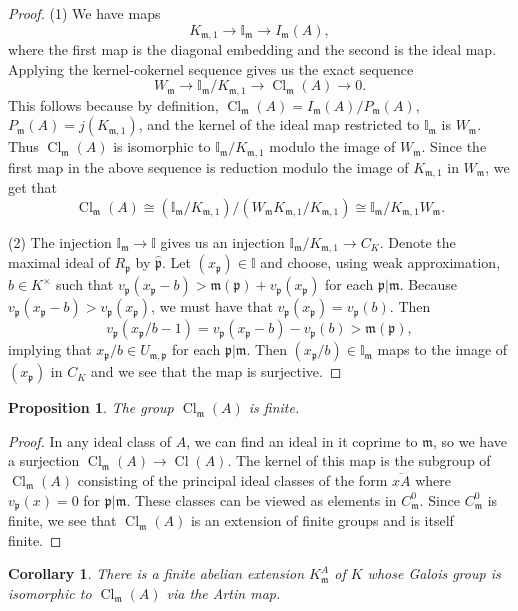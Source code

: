 \documentclass[12pt,reqno]{amsart}
\newcommand{\mm}{\mathfrak{m}}
\newcommand{\pp}{\mathfrak{p}}
\newcommand{\II}{\mathbb{I}}
\DeclareMathOperator{\Cl}{Cl}
\newtheorem{prop}[thm]{Proposition}
\newtheorem{cor}[thm]{Corollary}
\theoremstyle{definition}
\begin{document}
\begin{proof}
(1) We have maps
\[
K_{\mm,1}\to \II_{\mm}\to I_{\mm}(A),
\]
where the first map is the diagonal embedding and the second is the ideal map. Applying the kernel-cokernel sequence gives us the exact sequence
\[
W_{\mm} \to \II_{\mm}/K_{\mm,1}\to \Cl_{\mm}(A)\to 0.
\]
This follows because by definition, $\Cl_{\mm}(A)=I_{\mm}(A)/P_{\mm}(A)$, $P_{\mm}(A)
=j(K_{\mm,1})$, and the kernel of the ideal map restricted to
$\II_{\mm}$ is $W_{\mm}$. Thus $\Cl_{\mm}(A)$ is isomorphic to
$\II_{\mm}/K_{\mm,1}$ modulo the image of $W_{\mm}$. Since the
first map in the above sequence is reduction modulo the image of
$K_{\mm,1}$ in $W_{\mm}$, we get that
\[
\Cl_{\mm}(A)\cong (\II_{\mm}/K_{\mm,1})/(W_{\mm}K_{\mm,1}/K_{\mm,1})\cong \II_{\mm}/K_{\mm,1}W_{\mm}.
\]

(2) The injection $\II_{\mm}\to \II$ gives us an injection
$\II_{\mm}/K_{\mm,1}\to C_K$. Denote the maximal ideal of $R_{\pp}$ by $\hat{\pp}$. Let $(x_{\pp})\in \II$ and choose, using
weak approximation, $b\in K^{\times}$ such that $v_{\pp}(x_{\pp}-b)>\mm(\pp) + v_{\pp}(x_{\pp})$ for each $\pp|\mm$. Because $v_{\pp}(x_{\pp}-b)>v_{\pp}(x_{\pp})$, we must have that $v_{\pp}(x_{\pp})=v_{\pp}(b)$. Then 
\[
v_{\pp}(x_{\pp}/b-1)=v_{\pp}(x_{\pp}-b)-v_{\pp}(b)>\mm(\pp),
\]
 implying that $x_{\pp}/b\in U_{\mm,\pp}$ for each
$\pp|\mm$. Then $(x_{\pp}/b)\in \II_{\mm}$ maps to the image of
$(x_{\pp})$ in $C_K$ and we see that the map is surjective.
\end{proof}

\begin{prop}\label{Clmafinite}
The group $\Cl_{\mm}(A)$ is finite.
\end{prop}
\begin{proof}
 In any
   ideal class of $A$, we can find an ideal in it coprime to $\mm$, so we have a surjection $\Cl_{\mm}(A) \to \Cl(A)$. The kernel of this
  map is the subgroup of $\Cl_{\mm}(A)$ consisting of the principal
  ideal classes of the form $\overline{xA}$ where $v_{\pp}(x)=0$ for $\pp|\mm$. These classes can be viewed as elements in
  $C_{\mm}^0$. Since $C^0_{\mm}$ is finite, we see that $\Cl_{\mm}(A)$
  is an extension of finite groups and is itself finite.
\end{proof}

\begin{cor}
There is a finite abelian extension $K_{\mm}^A$ of $K$ whose Galois group is isomorphic to $\Cl_{\mm}(A)$ via the Artin map. 
\end{cor}
\end{document}

